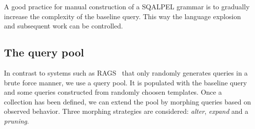 \documentclass{cidr-2019}
\begin{document}


A good practice for manual construction of a {\sc SQALPEL} grammar 
is to gradually increase the complexity of the baseline query.
This way the language explosion and subsequent work can be controlled. 

%

\subsection{The query pool}\label{morphing}
In contrast to systems such as RAGS~\cite{DBLP:conf/vldb/Slutz98} that
only randomly generates queries in a brute force manner, we use a query pool.
It is populated with the baseline query and some queries constructed from randomly choosen templates.
Once a collection has been defined, we can extend the pool by morphing queries based on observed behavior.
Three morphing strategies are considered: \emph{alter}, \emph{expand} and a \emph{pruning}. 
\end{document}
